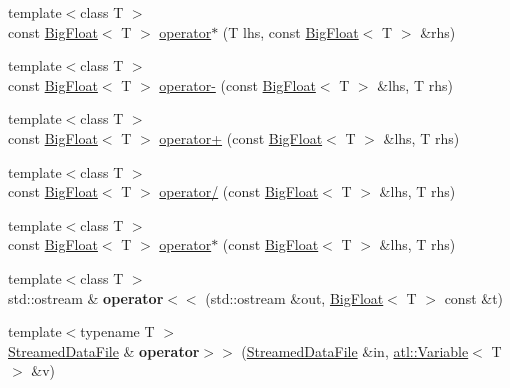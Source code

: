 \begin{DoxyCompactItemize}
\item 
{\footnotesize template$<$class T $>$ }\\const \hyperlink{classatl_1_1_big_float}{Big\+Float}$<$ T $>$ \hyperlink{namespaceatl_acc2601dda4a066a3691d98cefe56fb89}{operator$\ast$} (T lhs, const \hyperlink{classatl_1_1_big_float}{Big\+Float}$<$ T $>$ \&rhs)
\item 
{\footnotesize template$<$class T $>$ }\\const \hyperlink{classatl_1_1_big_float}{Big\+Float}$<$ T $>$ \hyperlink{namespaceatl_a475fd63a64ad0e35f7275f07fce25d62}{operator-\/} (const \hyperlink{classatl_1_1_big_float}{Big\+Float}$<$ T $>$ \&lhs, T rhs)
\item 
{\footnotesize template$<$class T $>$ }\\const \hyperlink{classatl_1_1_big_float}{Big\+Float}$<$ T $>$ \hyperlink{namespaceatl_a27d58f3f0f5f57ed51b39abadc5892cb}{operator+} (const \hyperlink{classatl_1_1_big_float}{Big\+Float}$<$ T $>$ \&lhs, T rhs)
\item 
{\footnotesize template$<$class T $>$ }\\const \hyperlink{classatl_1_1_big_float}{Big\+Float}$<$ T $>$ \hyperlink{namespaceatl_abc48e15f4df6540234803e630a19221d}{operator/} (const \hyperlink{classatl_1_1_big_float}{Big\+Float}$<$ T $>$ \&lhs, T rhs)
\item 
{\footnotesize template$<$class T $>$ }\\const \hyperlink{classatl_1_1_big_float}{Big\+Float}$<$ T $>$ \hyperlink{namespaceatl_a9d45c193cace3e9cc28db9d4f8199c2d}{operator$\ast$} (const \hyperlink{classatl_1_1_big_float}{Big\+Float}$<$ T $>$ \&lhs, T rhs)
\item 
\hypertarget{namespaceatl_a5491483df00ae8296d2aeeea78071011}{{\footnotesize template$<$class T $>$ }\\std\+::ostream \& {\bfseries operator$<$$<$} (std\+::ostream \&out, \hyperlink{classatl_1_1_big_float}{Big\+Float}$<$ T $>$ const \&t)}\label{namespaceatl_a5491483df00ae8296d2aeeea78071011}

\item 
\hypertarget{namespaceatl_aa72dcbe256e25d7a8d33d886b785914b}{{\footnotesize template$<$typename T $>$ }\\\hyperlink{classatl_1_1_streamed_data_file}{Streamed\+Data\+File} \& {\bfseries operator$>$$>$} (\hyperlink{classatl_1_1_streamed_data_file}{Streamed\+Data\+File} \&in, \hyperlink{structatl_1_1_variable}{atl\+::\+Variable}$<$ T $>$ \&v)}\label{namespaceatl_aa72dcbe256e25d7a8d33d886b785914b}


\end{DoxyCompactItemize}
